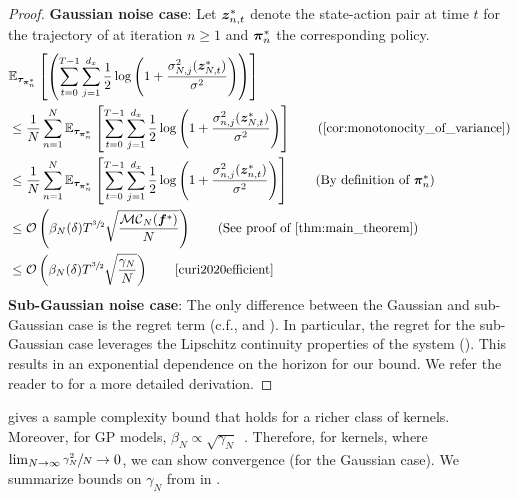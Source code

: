 \begin{proof}%
\textbf{Gaussian noise case}:
Let ${\bm{z}}^*_{n, t}$ denote the state-action pair at time $t$ for the trajectory of  at iteration $n\geq 1$ and ${\bm{\pi}}^*_n$ the corresponding policy.
   \begin{align*}
    &\E_{\vtau_{\vpi^*_n}}\left[\left(\sum_{t=0}^{T-1} \sum^{d_x}_{j=1}\frac{1}{2} \log \left(1 + \frac{\sigma_{N, j}^2(\vz^*_{N, t})}{\sigma^2}\right)\right)\right] \\
          &\leq \frac{1}{N} \sum^N_{n=1} \E_{\vtau_{\vpi^*_n}}\left[\sum_{t=0}^{T-1} \sum^{d_x}_{j=1}\frac{1}{2} \log \left(1 + \frac{\sigma_{n, j}^2(\vz^*_{N, t})}{\sigma^2}\right)\right] \tag{\Cref{cor:monotonocity_of_variance}}\\
          &\leq \frac{1}{N} \sum^N_{n=1} \E_{\vtau_{\vpi^*_n}}\left[\sum_{t=0}^{T-1} \sum^{d_x}_{j=1}\frac{1}{2} \log \left(1 + \frac{\sigma_{n, j}^2(\vz^*_{n, t})}{\sigma^2}\right)\right] \tag{By definition of $\vpi^*_n$}\\
          &\leq  \setO \left(\beta_{N}(\delta) T^{\sfrac{3}{2}}\sqrt{\frac{{\setM\setC}_N(\vf^*)}{N}}\right) \tag{See proof of \Cref{thm:main_theorem}}\\
          &\leq \setO \left(\beta_{N}(\delta) T^{\sfrac{3}{2}}\sqrt{\frac{\gamma_N}{N}}\right) \tag*{\cite[Lemma 17]{curi2020efficient}}
   \end{align*}
   \textbf{Sub-Gaussian noise case}: The only difference between the Gaussian and sub-Gaussian case is the regret term (c.f.,  and ). In particular, the regret for the sub-Gaussian case leverages the Lipschitz continuity properties of the system (). This results in an exponential dependence on the horizon for our bound. We refer the reader to \citet{curi2020efficient, rothfuss2023hallucinated} for a more detailed derivation.
   \end{proof}
    gives a sample complexity bound that holds for a richer class of kernels. Moreover, for GP models, $\beta_N \propto \sqrt{\gamma_N}$~\citep{chowdhury2017kernelized}. Therefore, for kernels, where $\lim_{N \to \infty} \sfrac{\gamma^{2}_N}{N} \to 0$, we can show convergence (for the Gaussian case). 
We summarize bounds on $\gamma_N$ from \cite{vakili2021information} in .
